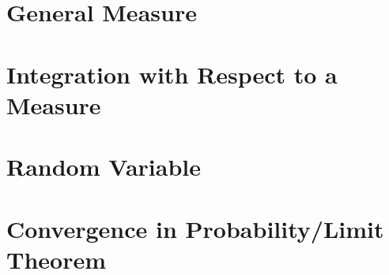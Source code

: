 \documentclass[11pt,fleqn]{book} %
\begin{document}
\chapter{General Measure}







\chapter{Integration with Respect to a Measure}






\chapter{Random Variable}




\chapter{Convergence in Probability/Limit Theorem}


\end{document}
